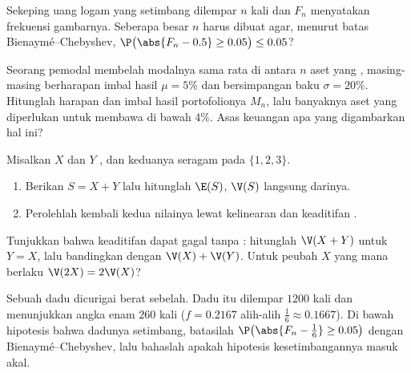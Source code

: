 \begin{exercise}[$\star$]\label{exo:g12:sums:3}
Sekeping uang logam yang setimbang dilempar $n$ kali dan $F_n$ menyatakan frekuensi gambarnya.
Seberapa besar $n$ harus dibuat agar, menurut batas Bienaymé--Chebyshev,
$\P\bigl(\abs{F_n - 0.5} \geq 0.05\bigr) \leq 0.05$?
\end{exercise}

\begin{exercise}[$\star\star$]\label{exo:g12:sums:4}
Seorang pemodal membelah modalnya sama rata di antara $n$ aset yang ,
masing-masing berharapan imbal hasil $\mu = 5\%$ dan bersimpangan baku
$\sigma = 20\%$. Hitunglah harapan dan 
imbal hasil portofolionya $M_n$, lalu banyaknya aset yang diperlukan untuk membawa
 di bawah $4\%$. Asas keuangan apa yang
digambarkan hal ini?
\end{exercise}

\begin{exercise}[$\star\star$]\label{exo:g12:sums:5}
Misalkan $X$ dan $Y$ , dan keduanya seragam pada $\{1, 2, 3\}$.
\begin{enumerate}
  \item Berikan  $S = X + Y$ lalu hitunglah $\E(S)$, $\V(S)$
        langsung darinya.
  \item Perolehlah kembali kedua nilainya lewat kelinearan dan keaditifan .
\end{enumerate}
\end{exercise}

\begin{exercise}[$\star\star$]\label{exo:g12:sums:6}
Tunjukkan bahwa keaditifan  dapat gagal tanpa :
hitunglah $\V(X + Y)$ untuk $Y = X$, lalu bandingkan dengan $\V(X) + \V(Y)$. Untuk
peubah $X$ yang mana berlaku $\V(2X) = 2\V(X)$?
\end{exercise}

\begin{exercise}[$\star\star$]\label{exo:g12:sums:7}
Sebuah dadu dicurigai berat sebelah. Dadu itu dilempar $1200$ kali dan menunjukkan
angka enam $260$ kali ($f = 0.2167$ alih-alih $\frac16 \approx 0.1667$). Di bawah
hipotesis bahwa dadunya setimbang, batasilah
$\P\bigl(\abs{F_n - \frac16} \geq 0.05\bigr)$ dengan Bienaymé--Chebyshev, lalu
bahaslah apakah hipotesis kesetimbangannya masuk akal.
\end{exercise}

